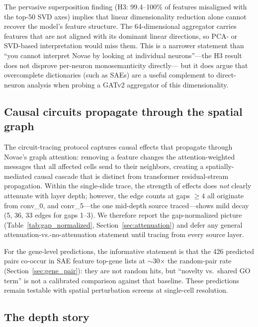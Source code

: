 \documentclass[11pt]{article}
\begin{document}
The pervasive superposition finding (H3: 99.4--100\% of features
misaligned with the top-50 SVD axes) implies that linear
dimensionality reduction alone cannot recover the model's feature
structure. The 64-dimensional aggregator carries features that are
not aligned with its dominant linear directions, so PCA- or SVD-based
interpretation would miss them. This is a narrower statement than
``you cannot interpret Novae by looking at individual neurons''---the
H3 result does not disprove per-neuron monosemanticity directly---
but it does argue that overcomplete dictionaries (such as SAEs) are
a useful complement to direct-neuron analysis when probing a GATv2
aggregator of this dimensionality.

\subsection{Causal circuits propagate through the spatial graph}

The circuit-tracing protocol captures causal effects that propagate
through Novae's graph attention: removing a feature changes the
attention-weighted messages that all affected cells send to their
neighbors, creating a spatially-mediated causal cascade that is
distinct from transformer residual-stream propagation. Within the
single-slide trace, the strength of effects does \emph{not} clearly
attenuate with layer depth; however, the edge counts at gaps $\geq 4$
all originate from conv\_0, and conv\_5---the one mid-depth source
traced---shows mild decay (5, 36, 33 edges for gaps 1--3). We
therefore report the gap-normalized picture
(Table~\ref{tab:gap_normalized},
Section~\ref{sec:attenuation}) and defer any general
attenuation-vs.-no-attenuation statement until tracing from every
source layer.

For the gene-level predictions, the informative statement is that
the 426 predicted pairs co-occur in SAE feature top-gene lists at
$\sim$30$\times$ the random-pair rate
(Section~\ref{sec:gene_pair}): they are not random hits,
but ``novelty vs.\ shared GO term'' is not a calibrated comparison
against that baseline. These predictions remain testable with
spatial perturbation screens at single-cell resolution.

\subsection{The depth story}
\label{sec:depth_story}
\end{document}
